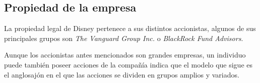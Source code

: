 \subsection{Propiedad de la empresa}
La propiedad legal de Disney pertenece a sus distintos accionistas, algunos de sus principales grupos son \textit{The Vanguard Group Inc.} o \textit{BlackRock Fund Advisors}.

Aunque los accionistas antes mencionados son grandes empresas, un individuo puede también poseer acciones de la compañía indica que el modelo que sigue es el anglosajón en el que las acciones se dividen en grupos amplios y variados.